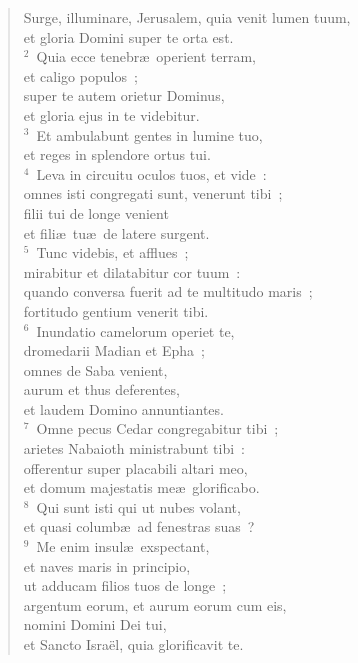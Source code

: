 \begin{flushleft}\begin{verse}\vspace{-19pt}\hspace{6pt}Surge, illuminare, Jerusalem, quia venit lumen tuum,\\\hspace{6pt} et gloria Domini super te orta est.\\
${}^{2}$~Quia ecce tenebr\ae\ operient terram,\\ et caligo populos~;\\ super te autem orietur Dominus,\\ et gloria ejus in te videbitur.\\
${}^{3}$~Et ambulabunt gentes in lumine tuo,\\ et reges in splendore ortus tui.\\
${}^{4}$~Leva in circuitu oculos tuos, et vide~:\\ omnes isti congregati sunt, venerunt tibi~;\\ filii tui de longe venient\\ et fili\ae\ tu\ae\ de latere surgent.\\
${}^{5}$~Tunc videbis, et afflues~;\\ mirabitur et dilatabitur cor tuum~:\\ quando conversa fuerit ad te multitudo maris~;\\ fortitudo gentium venerit tibi.\\
${}^{6}$~Inundatio camelorum operiet te,\\ dromedarii Madian et Epha~;\\ omnes de Saba venient,\\ aurum et thus deferentes,\\ et laudem Domino annuntiantes.\\
${}^{7}$~Omne pecus Cedar congregabitur tibi~;\\ arietes Nabaioth ministrabunt tibi~:\\ offerentur super placabili altari meo,\\ et domum majestatis me\ae\ glorificabo.\\
${}^{8}$~Qui sunt isti qui ut nubes volant,\\ et quasi columb\ae\ ad fenestras suas~?\\
${}^{9}$~Me enim insul\ae\ exspectant,\\ et naves maris in principio,\\ ut adducam filios tuos de longe~;\\ argentum eorum, et aurum eorum cum eis,\\ nomini Domini Dei tui,\\ et Sancto Isra\"el, quia glorificavit te.\\

\end{verse}
\end{flushleft}
